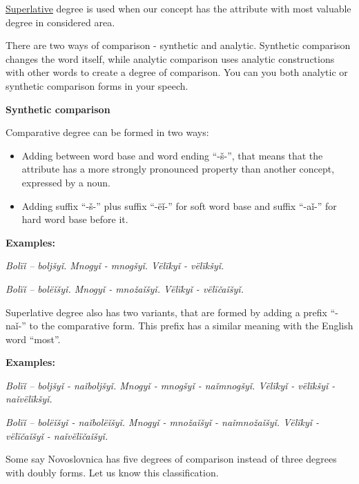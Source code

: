 \underline{Superlative} degree is used when our concept has the attribute with most valuable degree in considered area.

There are two ways of comparison - synthetic and analytic. Synthetic comparison changes the word itself, while analytic comparison uses analytic constructions with other words to create a degree of comparison. You can you both analytic or synthetic comparison forms in your speech.

\textbf{Synthetic comparison}

Comparative degree can be formed in two ways: 

\begin{itemize}
	\item Adding between word base and word ending “-š-”, that means that the attribute has a more strongly pronounced property than another concept, expressed by a noun.
	\item Adding suffix “-š-” plus suffix “-ëǐ-” for soft word base and suffix “-aǐ-” for hard word base before it.
\end{itemize}

\textbf{Examples:}

\textit{Bolïǐ – boljšyǐ. Mnogyǐ - mnogšyǐ. Vëlïkyǐ - vëlïkšyǐ.}

\textit{Bolïǐ – bolëǐšyǐ. Mnogyǐ - množaǐšyǐ. Vëlïkyǐ - vëlïčaǐšyǐ.}

Superlative degree also has two variants, that are formed by adding a prefix “-naǐ-” to the comparative form. This prefix has a similar meaning with the English word “most”.

\textbf{Examples:}

\textit{Bolïǐ – boljšyǐ - naǐboljšyǐ. Mnogyǐ - mnogšyǐ - naǐmnogšyǐ. Vëlïkyǐ - vëlïkšyǐ - naǐvëlïkšyǐ.}

\textit{Bolïǐ – bolëǐšyǐ - naǐbolëǐšyǐ. Mnogyǐ - množaǐšyǐ - naǐmnožaǐšyǐ. Vëlïkyǐ - vëlïčaǐšyǐ - naǐvëlïčaǐšyǐ.}

Some say Novoslovnica has five degrees of comparison instead of three degrees with doubly forms. Let us know this classification.

